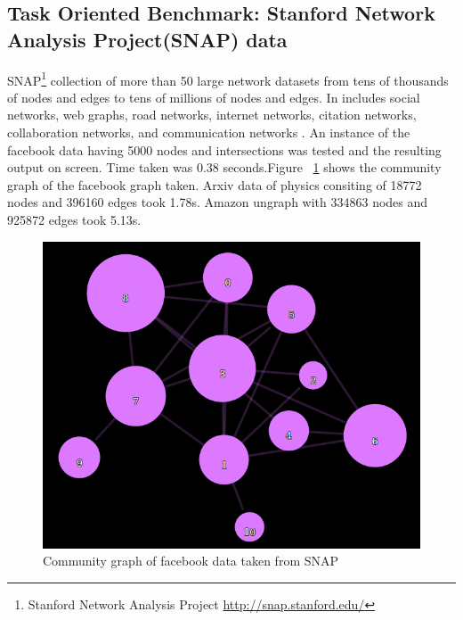 \subsection{Task Oriented Benchmark: Stanford Network Analysis Project(SNAP) data}
SNAP\footnote{Stanford Network Analysis Project \url{http://snap.stanford.edu/}} collection of more than 50 large network datasets from tens of thousands of nodes and edges to tens of millions of nodes and edges. In includes social networks, web graphs, road networks, internet networks, citation networks, collaboration networks, and communication networks \cite{snap}. An instance of the facebook data having 5000 nodes and intersections was tested and the resulting output on screen. Time taken was 0.38 seconds.Figure ~\ref{digfb} shows the community graph of the facebook graph taken. Arxiv data of physics consiting of 18772 nodes and  396160 edges took 1.78s. Amazon ungraph with 334863 nodes  and 925872 edges took 5.13s.

\begin{figure}[H]
\centering
\includegraphics[scale=0.3]{fb.png}
\caption{\label{digfb}Community graph of facebook data taken from SNAP}
\end{figure}

